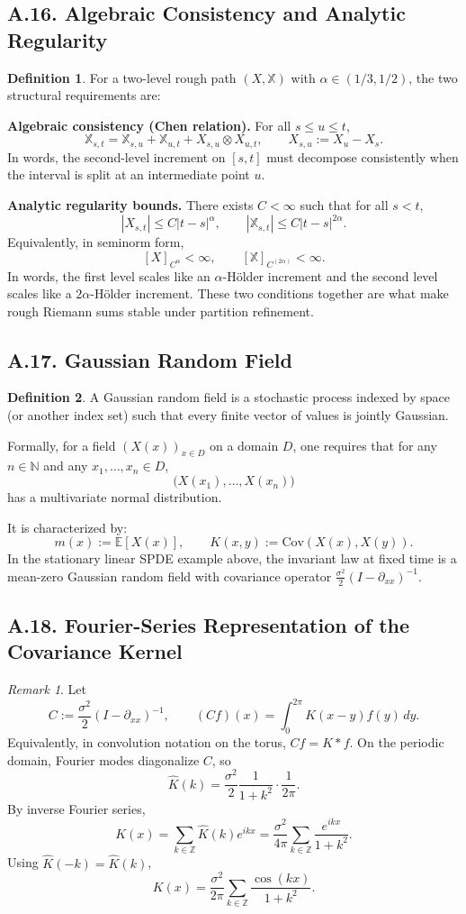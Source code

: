 \documentclass[11pt]{article}
\theoremstyle{definition}
\newtheorem{definition}{Definition}
\theoremstyle{remark}
\newtheorem{remark}{Remark}
\begin{document}
\subsection*{A.16. Algebraic Consistency and Analytic Regularity}
\begin{definition}
For a two-level rough path $(X,\mathbb X)$ with $\alpha\in(1/3,1/2)$, the two structural requirements are:

\textbf{Algebraic consistency (Chen relation).} For all $s\le u\le t$,
\[
\mathbb X_{s,t}
=
\mathbb X_{s,u}
+\mathbb X_{u,t}
+X_{s,u}\otimes X_{u,t},
\qquad
X_{s,u}:=X_u-X_s.
\]
In words, the second-level increment on $[s,t]$ must decompose consistently when the interval is split at an intermediate point $u$.

\textbf{Analytic regularity bounds.} There exists $C<\infty$ such that for all $s<t$,
\[
|X_{s,t}|\le C|t-s|^\alpha,
\qquad
|\mathbb X_{s,t}|\le C|t-s|^{2\alpha}.
\]
Equivalently, in seminorm form,
\[
[X]_{C^\alpha}<\infty,
\qquad
[\mathbb X]_{C^{(2\alpha)}}<\infty.
\]
In words, the first level scales like an $\alpha$-H\"older increment and the second level scales like a $2\alpha$-H\"older increment.
These two conditions together are what make rough Riemann sums stable under partition refinement.
\end{definition}

\subsection*{A.17. Gaussian Random Field}
\begin{definition}
A Gaussian random field is a stochastic process indexed by space (or another index set) such that every finite vector of values is jointly Gaussian.

Formally, for a field $(X(x))_{x\in D}$ on a domain $D$, one requires that for any $n\in\mathbb N$ and any $x_1,\dots,x_n\in D$,
\[
\bigl(X(x_1),\dots,X(x_n)\bigr)
\]
has a multivariate normal distribution.

It is characterized by:
\[
m(x):=\mathbb E[X(x)],
\qquad
K(x,y):=\mathrm{Cov}(X(x),X(y)).
\]
In the stationary linear SPDE example above, the invariant law at fixed time is a mean-zero Gaussian random field with covariance operator $\frac{\sigma^2}{2}(I-\partial_{xx})^{-1}$.
\end{definition}

\subsection*{A.18. Fourier-Series Representation of the Covariance Kernel}
\begin{remark}
Let
\[
C:=\frac{\sigma^2}{2}(I-\partial_{xx})^{-1},
\qquad
(Cf)(x)=\int_0^{2\pi}K(x-y)f(y)\,dy.
\]
Equivalently, in convolution notation on the torus, $Cf=K*f$.
On the periodic domain, Fourier modes diagonalize $C$, so
\[
\widehat K(k)=\frac{\sigma^2}{2}\frac{1}{1+k^2}\cdot\frac{1}{2\pi}.
\]
By inverse Fourier series,
\[
K(x)=\sum_{k\in\mathbb Z}\widehat K(k)e^{ikx}
=\frac{\sigma^2}{4\pi}\sum_{k\in\mathbb Z}\frac{e^{ikx}}{1+k^2}.
\]
Using $\widehat K(-k)=\widehat K(k)$,
\[
K(x)=\frac{\sigma^2}{2\pi}\sum_{k\in\mathbb Z}\frac{\cos(kx)}{1+k^2}.
\]
\end{remark}
\end{document}
